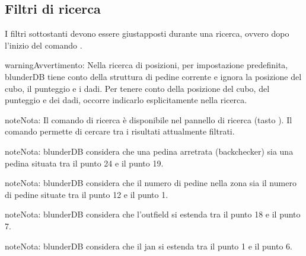 \documentclass[letterpaper,10pt,italian]{sphinxmanual}
\begin{document}
\subsection{Filtri di ricerca}
\label{\detokenize{cmd_mode:filtres-de-recherche}}\label{\detokenize{cmd_mode:cmd-filter}}
\sphinxAtStartPar
I filtri sottostanti devono essere giustapposti durante una ricerca, ovvero dopo l’inizio del comando .

\label{\detokenize{cmd_mode:cmd-filter-pos}}
\begin{sphinxadmonition}{warning}{Avvertimento:}
\sphinxAtStartPar
Nella ricerca di posizioni, per impostazione predefinita, blunderDB tiene conto della struttura di pedine corrente e ignora la posizione del cubo, il punteggio e i dadi. Per tenere conto della posizione del cubo, del punteggio e dei dadi, occorre indicarlo esplicitamente nella ricerca.
\end{sphinxadmonition}

\begin{sphinxadmonition}{note}{Nota:}
\sphinxAtStartPar
Il comando di ricerca  è disponibile nel pannello di ricerca (tasto ). Il comando  permette di cercare tra i risultati attualmente filtrati.
\end{sphinxadmonition}

\begin{sphinxadmonition}{note}{Nota:}
\sphinxAtStartPar
blunderDB considera che una pedina arretrata (backchecker) sia una pedina situata tra il punto 24 e il punto 19.
\end{sphinxadmonition}

\begin{sphinxadmonition}{note}{Nota:}
\sphinxAtStartPar
blunderDB considera che il numero di pedine nella zona sia il numero di pedine situate tra il punto 12 e il punto 1.
\end{sphinxadmonition}

\begin{sphinxadmonition}{note}{Nota:}
\sphinxAtStartPar
blunderDB considera che l’outfield si estenda tra il punto 18 e il punto 7.
\end{sphinxadmonition}

\begin{sphinxadmonition}{note}{Nota:}
\sphinxAtStartPar
blunderDB considera che il jan si estenda tra il punto 1 e il punto 6.
\end{sphinxadmonition}
\end{document}
